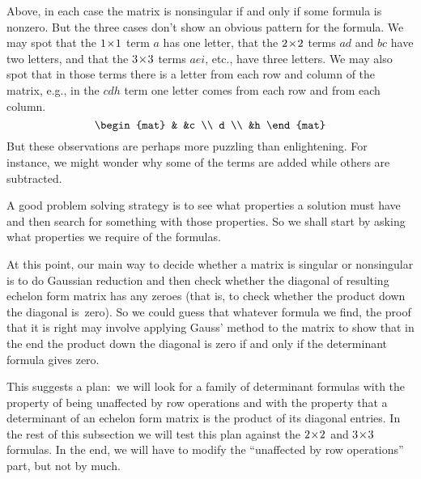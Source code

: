 Above, in each case the matrix is nonsingular if and only 
if some formula is nonzero.
But the three cases don't 
show an obvious pattern for the formula. 
We may spot that the \(1 \! \times \! 1\) term
\( a \) has one letter, that the \(2 \! \times \! 2\) terms
\(ad\) and \(bc\) have two letters, and that the \(3 \! \times \! 3\)
terms \(aei\), etc., have three letters.
We may also spot that in those terms
there is a letter from each row and column of the matrix, e.g., 
in the \(cdh\) term one letter 
comes from each row and from each column.
\begin{equation*}
   \begin{mat}
          &    &c \\
      d           \\
          &h
   \end{mat} 
\end{equation*}
But these observations are perhaps more puzzling than
enlightening.
For instance, we might wonder why 
some of the terms are added while others are subtracted.

A good problem solving strategy is to
see what properties a solution must have and
then search for something with those properties.
So we shall start by asking what properties we require of the formulas.

At this point, our
main way to decide whether a matrix is singular or nonsingular
is to do Gaussian 
reduction and then check whether 
the diagonal of resulting echelon form matrix has any zeroes
(that is, to check whether the product down the diagonal is~zero).
So we could guess that whatever formula we find, the proof that 
it is right may involve applying Gauss' method to the matrix
to show that in the end the product down the diagonal is zero if and only if
the determinant formula gives zero. 

This suggests a plan:~we will look for a family of determinant
formulas with the property of being
unaffected by row operations and with the property that a determinant of an
echelon form matrix is the product of its diagonal entries.
In the rest of this subsection we will test this plan against the 
$2 \! \times \! 2$ and $3 \! \times \! 3$ formulas.
In the end, we will have to modify the ``unaffected by row operations'' 
part, but not by much.


